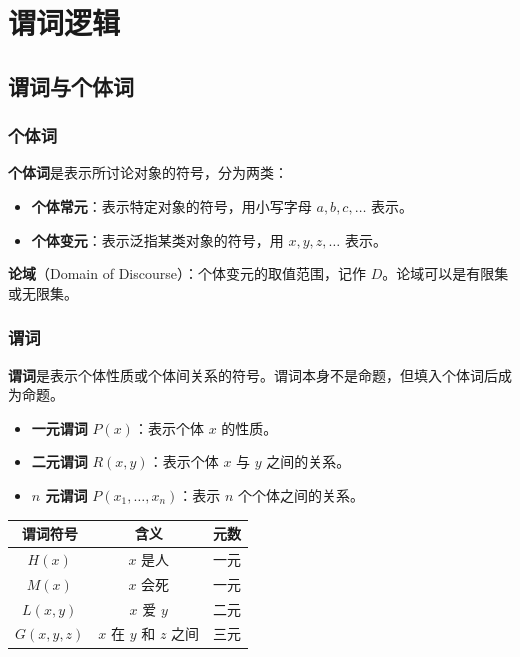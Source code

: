 \chapter{谓词逻辑}

\section{谓词与个体词}

\subsection{个体词}

\textbf{个体词}是表示所讨论对象的符号，分为两类：
\begin{itemize}
\item \textbf{个体常元}：表示特定对象的符号，用小写字母 $a,b,c,\dots$ 表示。
\item \textbf{个体变元}：表示泛指某类对象的符号，用 $x,y,z,\dots$ 表示。
\end{itemize}

\textbf{论域}（Domain of Discourse）：个体变元的取值范围，记作 $D$。论域可以是有限集或无限集。

\subsection{谓词}

\textbf{谓词}是表示个体性质或个体间关系的符号。谓词本身不是命题，但填入个体词后成为命题。
\begin{itemize}
\item \textbf{一元谓词} $P(x)$：表示个体 $x$ 的性质。
\item \textbf{二元谓词} $R(x,y)$：表示个体 $x$ 与 $y$ 之间的关系。
\item \textbf{$n$ 元谓词} $P(x_1,\dots,x_n)$：表示 $n$ 个个体之间的关系。
\end{itemize}

\begin{center}
\begin{tabular}{c|c|c}
\toprule
谓词符号 & 含义 & 元数 \\
\midrule
$H(x)$ & $x$ 是人 & 一元 \\
$M(x)$ & $x$ 会死 & 一元 \\
$L(x,y)$ & $x$ 爱 $y$ & 二元 \\
$G(x,y,z)$ & $x$ 在 $y$ 和 $z$ 之间 & 三元 \\
\bottomrule
\end{tabular}
\end{center}

